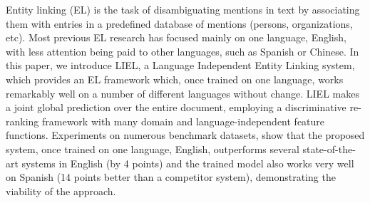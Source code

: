 Entity linking (EL) is the task of disambiguating mentions in text by associating them with entries in a predefined database of mentions (persons, organizations, etc). Most previous EL research has focused mainly on one language, English, with less attention being paid to other languages, such as Spanish or Chinese. In this paper, we introduce LIEL, a Language Independent Entity Linking system, which provides an EL framework which, once trained on one language, works remarkably well on a number of different languages without change. LIEL makes a joint global prediction over the entire document, employing a discriminative re-ranking framework with many domain and language-independent feature functions. Experiments on numerous benchmark datasets, show that the proposed system, once trained on one language, English, outperforms several state-of-the-art systems in English (by 4 points) and the trained model also works very well on Spanish (14 points better than a competitor system), demonstrating the viability of the approach.
